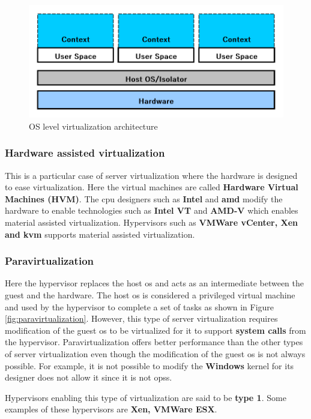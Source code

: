\begin{figure}[!h]
    \centering 
    \includegraphics[scale=0.65]{fig02/os-level-virtualization.pdf}
    \caption{OS level virtualization architecture}
    \label{fig:os-level-virtualization}
\end{figure}

\subsubsection{Hardware assisted virtualization}
This is a particular case of server virtualization where the hardware is designed to ease virtualization. Here the virtual machines are called \textbf{Hardware Virtual Machines (HVM)}. The \acrshort{cpu} designers such as \textbf{Intel} and \textbf{\acrshort{amd}} modify the hardware to enable technologies such as \textbf{Intel VT} and \textbf{AMD-V} which enables material assisted virtualization. Hypervisors such as \textbf{VMWare vCenter, Xen and \acrshort{kvm}} supports material assisted virtualization.

\subsubsection{Paravirtualization}
Here the hypervisor replaces the host \acrshort{os} and acts as an intermediate between the guest and the hardware. The host \acrshort{os} is considered a privileged virtual machine and used by the hypervisor to complete a set of tasks as shown in Figure \ref{fig:paravirtualization}. However, this type of server virtualization requires modification of the guest \acrshort{os} to be virtualized for it to support \textbf{system calls} from the hypervisor. Paravirtualization offers better performance than the other types of server virtualization even though the modification of the guest \acrshort{os} is not always possible. For example, it is not possible to modify the \textbf{Windows} kernel for its designer does not allow it since it is not \glspl{ops}. 
\par Hypervisors enabling this type of virtualization are said to be \textbf{type 1}. Some examples of these hypervisors are \textbf{Xen, VMWare ESX}.

